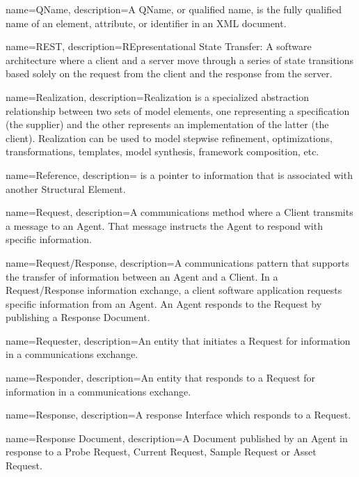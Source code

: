{
    name={QName},
	description={A \gls{QName}, or qualified name, is the fully qualified name of an element, attribute, or identifier in an XML document.}
}

{
    name={REST},
	description={REpresentational State Transfer:  A software architecture where a client and a server move through a series of state transitions based solely on the request from the client and the response from the server. 
}
}

{
    name={Realization},
	description={Realization is a specialized abstraction relationship between two sets of model elements, one representing a specification (the supplier) and the other represents an implementation of the latter (the client). Realization can be used to model stepwise refinement, optimizations, transformations, templates, model synthesis, framework composition, etc.}
}

{
    name={Reference},
	description={ is a pointer to information that is associated with another \gls{Structural Element}.}
}

{
    name={Request},
	description={A communications method where a \gls{Client} transmits a message to an \gls{Agent}.  That message instructs the \gls{Agent} to respond with specific information.}
}

{
    name={Request/Response},
	description={A communications pattern that supports the transfer of information between an \gls{Agent} and a \gls{Client}. 
In a \gls{Request/Response} information exchange, a client software application requests specific information from an \gls{Agent}. An \gls{Agent} responds to the \gls{Request} by publishing a \gls{Response Document}. }
}

{
    name={Requester},
	description={An entity that initiates a \gls{Request} for information in a communications exchange.}
}

{
    name={Responder},
	description={An entity that responds to a \gls{Request} for information in a communications exchange.}
}

{
    name={Response},
	description={A response \gls{Interface} which responds to a \gls{Request}.}
}

{
    name={Response Document},
	description={A \gls{Document} published by an \gls{Agent} in response to a \gls{Probe Request}, \gls{Current Request}, \gls{Sample Request} or \gls{Asset Request}.}
}

